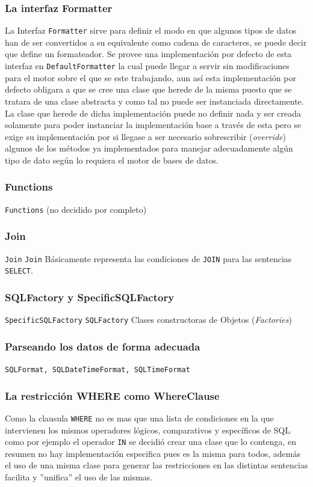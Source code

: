 \subsubsection{La interfaz Formatter}
La Interfaz \verb=Formatter= sirve para definir el modo en que algunos tipos de datos han de ser convertidos a su equivalente como cadena de caracteres, se puede decir que define un formateador. Se provee una implementación por defecto de esta interfaz en \verb=DefaultFormatter= la cual puede llegar a servir sin modificaciones para el motor sobre el que se este trabajando, aun así esta implementación por defecto obligara a que se cree una clase que herede de la misma puesto que se tratara de una clase abstracta y como tal no puede ser instanciada directamente. La clase que herede de dicha implementación puede no definir nada y ser creada solamente para poder instanciar la implementación base a través de esta pero se exige su implementación por si llegase a ser necesario sobrescribir (\textit{override}) algunos de los métodos ya implementados para manejar adecuadamente algún tipo de dato según lo requiera el motor de bases de datos.

\subsubsection{Functions}
\verb=Functions= (no decidido por completo)

\subsubsection{Join}
\verb=Join=
\verb=Join= Básicamente representa las condiciones de \verb=JOIN= para las sentencias \verb=SELECT=.

\subsubsection{SQLFactory y SpecificSQLFactory}
\verb=SpecificSQLFactory=
\verb=SQLFactory=
Clases constructoras de Objetos (\textit{Factories})
\subsubsection{Parseando los datos de forma adecuada}
\verb=SQLFormat, SQLDateTimeFormat, SQLTimeFormat=

\subsubsection{La restricción WHERE como WhereClause}
Como la clausula \verb=WHERE= no es mas que una lista de condiciones en la que intervienen los mismos operadores lógicos, comparativos y específicos de SQL como por ejemplo el operador \verb=IN= se decidió crear una clase que lo contenga, en resumen no hay implementación especifica pues es la misma para todos, además el uso de una misma clase para generar las restricciones en las distintas sentencias facilita y ''unifica'' el uso de las mismas.

